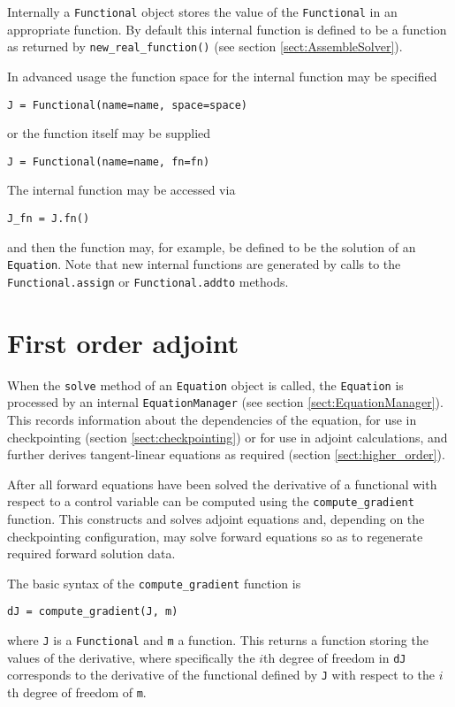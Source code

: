 \documentclass[11pt]{article}
\begin{document}
Internally a \texttt{Functional} object stores the value of the
\texttt{Functional} in an appropriate function. By default this internal
function is defined to be a function as returned by
\texttt{new\_real\_function()} (see section \ref{sect:AssembleSolver}).

In advanced usage the function space for the internal function may be specified
\begin{lstlisting}
J = Functional(name=name, space=space)
\end{lstlisting}
or the function itself may be supplied
\begin{lstlisting}
J = Functional(name=name, fn=fn)
\end{lstlisting}
The internal function may be accessed via
\begin{lstlisting}
J_fn = J.fn()
\end{lstlisting}
and then the function may, for example, be defined to be the solution of an
\texttt{Equation}. Note that new internal functions are generated by calls to
the \texttt{Functional.assign} or \texttt{Functional.addto} methods.

\section{First order adjoint}\label{sect:first_order_adjoint}

When the \texttt{solve} method of an \texttt{Equation} object is called, the
\texttt{Equation} is processed by an internal \texttt{EquationManager} (see
section \ref{sect:EquationManager}). This records information about the
dependencies of the equation, for use in checkpointing (section
\ref{sect:checkpointing}) or for use in adjoint calculations, and further
derives tangent-linear equations as required (section \ref{sect:higher_order}).

After all forward equations have been solved the derivative of a functional
with respect to a control variable can be computed using the
\texttt{compute\_gradient} function. This constructs and solves adjoint
equations and, depending on the checkpointing configuration, may solve forward
equations so as to regenerate required forward solution data.

The basic syntax of the \texttt{compute\_gradient} function is
\begin{lstlisting}
dJ = compute_gradient(J, m)
\end{lstlisting}
where \texttt{J} is a \texttt{Functional} and \texttt{m} a function. This
returns a function storing the values of the derivative, where specifically the
$i$th degree of freedom in \texttt{dJ} corresponds to the derivative of the
functional defined by \texttt{J} with respect to the $i$th degree of freedom of
\texttt{m}.
\end{document}
